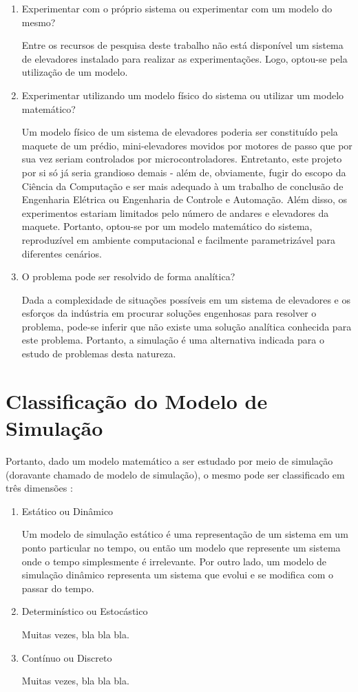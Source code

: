 \begin{enumerate}
\item Experimentar com o próprio sistema ou experimentar com um modelo do mesmo?

Entre os recursos de pesquisa deste trabalho não está disponível um sistema de
elevadores instalado para realizar as experimentações. Logo, optou-se pela
utilização de um modelo.

\item Experimentar utilizando um modelo físico do sistema ou utilizar um modelo
matemático?

Um modelo físico de um sistema de elevadores poderia ser constituído pela
maquete de um prédio, mini-elevadores movidos por motores de passo que por sua
vez seriam controlados por microcontroladores. Entretanto, este projeto por si
só já seria grandioso demais - além de, obviamente, fugir do escopo da Ciência
da Computação e ser mais adequado à um trabalho de conclusão de Engenharia
Elétrica ou Engenharia de Controle e Automação. Além disso, os experimentos
estariam limitados pelo número de andares e elevadores da maquete. Portanto,
optou-se por um modelo matemático do sistema, reproduzível em ambiente
computacional e facilmente parametrizável para diferentes cenários.

\item O problema pode ser resolvido de forma analítica?

Dada a complexidade de situações possíveis em um sistema de elevadores e os
esforços da indústria em procurar soluções engenhosas para resolver o problema,
pode-se inferir que não existe uma solução analítica conhecida para este
problema. Portanto, a simulação é uma alternativa indicada para o estudo de
problemas desta natureza.

\end{enumerate}

\section{Classificação do Modelo de Simulação}

Portanto, dado um modelo matemático a ser estudado por meio de simulação
(doravante chamado de modelo de simulação), o mesmo pode ser classificado em
três dimensões \cite{Banks,Law}:

\begin{enumerate}
\item Estático ou Dinâmico

Um modelo de simulação estático é uma representação de um sistema em um ponto
particular no tempo, ou então um modelo que represente um sistema onde o tempo
simplesmente é irrelevante. Por outro lado, um modelo de simulação dinâmico
representa um sistema que evolui e se modifica com o passar do tempo.

\item Determinístico ou Estocástico

Muitas vezes, bla bla bla.

\item Contínuo ou Discreto

Muitas vezes, bla bla bla.

\end{enumerate}